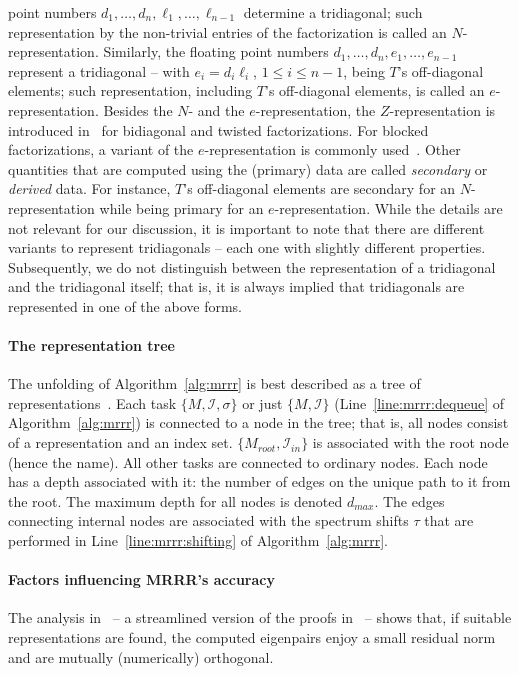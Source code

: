 \documentclass[final]{siamltex}
\begin{document}
point numbers $d_1,\ldots,d_n,\ell_1,\ldots,\ell_{n-1}$ determine a
tridiagonal; such representation by the non-trivial entries of the
factorization is called an $N$-representation. 
Similarly, the floating point numbers
$d_1,\ldots,d_n,e_1,\ldots,e_{n-1}$ represent a tridiagonal -- with $e_i = d_i \ell_i$,
$1 \leq i \leq n-1$,
being $T$'s off-diagonal elements; such representation, including $T$'s
off-diagonal elements, is called an $e$-representation. Besides the $N$- and
the $e$-representation, the $Z$-representation is introduced
in~\cite{Willems:twisted} for bidiagonal and twisted factorizations. For
blocked factorizations, a variant of the $e$-representation is commonly
used~\cite{Willems:blocked}. 
Other quantities that are computed using the
(primary) data are called {\it secondary} or {\it derived} data. For
instance, $T$'s off-diagonal 
elements are secondary for an $N$-representation while
being primary for an $e$-representation. While the details are not relevant
for our discussion, it is important to note that there are different
variants to represent tridiagonals -- each one with slightly different properties.
Subsequently, we do not distinguish between the representation of a
tridiagonal and the tridiagonal itself; that is, it is always implied that
tridiagonals are represented in one of the above forms.

\paragraph{The representation tree}
The unfolding of Algorithm~\ref{alg:mrrr} is best described as a tree of
representations~\cite{Dhillon:Diss,Dhillon:2004:MRRR,Willems:framework}. Each task
$\{M, \mathcal{I}, \sigma\}$ or just $\{M, \mathcal{I}\}$ (Line~\ref{line:mrrr:dequeue} of
Algorithm~\ref{alg:mrrr}) is connected to a
node in the tree; that is, all nodes consist of a representation and an
index set. $\{M_{root},\mathcal{I}_{in}\}$ is associated with the root node (hence the name).
All other tasks are connected to ordinary nodes. Each node has a
depth associated with it: the number of edges on the unique path to it from
the root. The maximum depth for all nodes is denoted $d_{max}$. The edges
connecting internal nodes are associated with the spectrum shifts $\tau$ that are
performed in Line~\ref{line:mrrr:shifting} of Algorithm~\ref{alg:mrrr}. 

\paragraph{Factors influencing MRRR's accuracy} The analysis
in~\cite{Willems:framework} 
-- a streamlined version of the proofs
in~\cite{Dhillon:2004:MRRR,Dhillon:2004:Ortvecs} --  shows that, if suitable
representations are found, the 
computed eigenpairs enjoy a small residual norm and are mutually
(numerically) orthogonal. 
\end{document}
